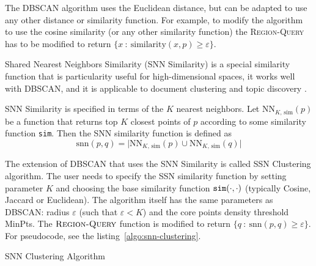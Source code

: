 The DBSCAN algorithm uses the Euclidean distance, but can be adapted to 
use any other distance or similarity function. For example, to modify the 
algorithm to use the cosine similarity (or any other similarity function)
the \textsc{Region-Query} has to be modified to return
$\{ x \ : \ \text{similarity}(x, p) \geqslant \varepsilon \}$.

Shared Nearest Neighbors Similarity (SNN Similarity) \cite{ertoz2003finding}
is a special similarity function that is particularity useful for
high-dimensional spaces, it works well with DBSCAN, and it is
applicable to document clustering and topic discovery \cite{ertoz2004finding}.

SNN Similarity is specified in terms of the $K$ nearest neighbors.
Let $\text{NN}_{K, \, \text{sim}}(p)$ be a function that returns
top $K$ closest points of $p$ according to some similarity function
\texttt{sim}. Then the SNN similarity function is  defined as
$$\text{snn}(p, q) = \big| \text{NN}_{K, \, \text{sim}}(p) \cup \text{NN}_{K, \, \text{sim}}(q) \big|$$


The extension of DBSCAN that uses the SNN Similarity is called
SSN Clustering algorithm. The user needs to specify the SSN similarity
function by setting parameter $K$ and choosing the base similarity
function $\text{\texttt{sim}}(\cdot, \cdot)$ (typically Cosine, Jaccard
or Euclidean). The algorithm itself has the same
parameters as DBSCAN: radius $\varepsilon$ (such that $\varepsilon < K$)
and the core points density threshold MinPts. The
$\textsc{Region-Query}$ function is modified to return
$\{ q \ : \ \text{snn}(p, q) \geqslant \varepsilon \}$. For pseudocode,
see the listing~\ref{algo:snn-clustering}.

\begin{algorithm} \caption{SNN Clustering Algorithm} \label{algo:snn-clustering}

\begin{algorithmic}[0]
  \Statex
     
    \EndFor

     
    \EndFor

    \State {}
  \EndFunction
\end{algorithmic}

\end{algorithm}


